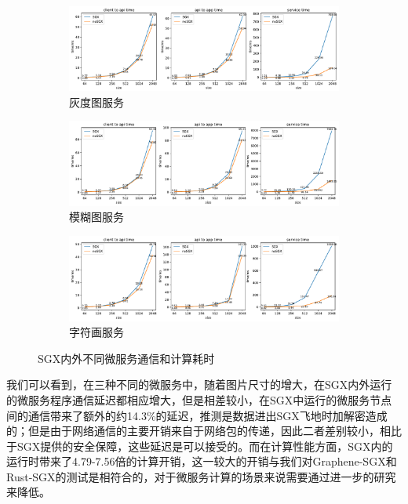 \begin{figure}[!ht]
    \centering
    \begin{subfigure}{0.96\textwidth}
        \centering
        \includegraphics[width=\textwidth]{figures/grayscale.pdf}
        \caption{灰度图服务}
    \end{subfigure}
    \begin{subfigure}{0.96\textwidth}
        \centering
        \includegraphics[width=\textwidth]{figures/blur.pdf}
        \caption{模糊图服务}
    \end{subfigure}
    \begin{subfigure}{0.96\textwidth}
        \centering
        \includegraphics[width=\textwidth]{figures/ascii.pdf}
        \caption{字符画服务}
    \end{subfigure}
    \caption{SGX内外不同微服务通信和计算耗时}
    \label{fig:evaluation}
\end{figure}

我们可以看到，在三种不同的微服务中，随着图片尺寸的增大，在SGX内外运行的微服务程序通信延迟都相应增大，但是相差较小，在SGX中运行的微服务节点间的通信带来了额外的约14.3\%的延迟，推测是数据进出SGX飞地时加解密造成的；但是由于网络通信的主要开销来自于网络包的传递，因此二者差别较小，相比于SGX提供的安全保障，这些延迟是可以接受的。而在计算性能方面，SGX内的运行时带来了4.79-7.56倍的计算开销，这一较大的开销与我们对Graphene-SGX和Rust-SGX的测试是相符合的，对于微服务计算的场景来说需要通过进一步的研究来降低。

